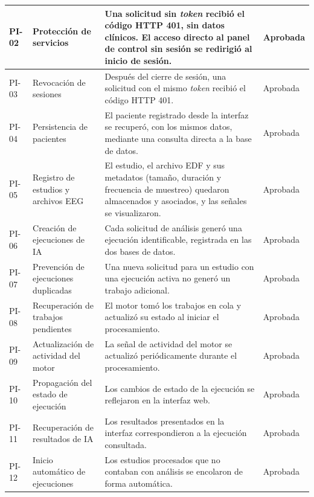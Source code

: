 \begin{nuevotexto}
\begin{longtable}{|p{1.25cm}|p{3.4cm}|p{7.6cm}|p{1.75cm}|}
PI-02 &
Protección de servicios &
Una solicitud sin \textit{token} recibió el código HTTP 401, sin datos clínicos. El acceso directo al panel de control sin sesión se redirigió al inicio de sesión. &
Aprobada \\
\hline

PI-03 &
Revocación de sesiones &
Después del cierre de sesión, una solicitud con el mismo \textit{token} recibió el código HTTP 401. &
Aprobada \\
\hline

PI-04 &
Persistencia de pacientes &
El paciente registrado desde la interfaz se recuperó, con los mismos datos, mediante una consulta directa a la base de datos. &
Aprobada \\
\hline

PI-05 &
Registro de estudios y archivos EEG &
El estudio, el archivo EDF y sus metadatos (tamaño, duración y frecuencia de muestreo) quedaron almacenados y asociados, y las señales se visualizaron. &
Aprobada \\
\hline

PI-06 &
Creación de ejecuciones de IA &
Cada solicitud de análisis generó una ejecución identificable, registrada en las dos bases de datos. &
Aprobada \\
\hline

PI-07 &
Prevención de ejecuciones duplicadas &
Una nueva solicitud para un estudio con una ejecución activa no generó un trabajo adicional. &
Aprobada \\
\hline

PI-08 &
Recuperación de trabajos pendientes &
El motor tomó los trabajos en cola y actualizó su estado al iniciar el procesamiento. &
Aprobada \\
\hline

PI-09 &
Actualización de actividad del motor &
La señal de actividad del motor se actualizó periódicamente durante el procesamiento. &
Aprobada \\
\hline

PI-10 &
Propagación del estado de ejecución &
Los cambios de estado de la ejecución se reflejaron en la interfaz web. &
Aprobada \\
\hline

PI-11 &
Recuperación de resultados de IA &
Los resultados presentados en la interfaz correspondieron a la ejecución consultada. &
Aprobada \\
\hline

PI-12 &
Inicio automático de ejecuciones &
Los estudios procesados que no contaban con análisis se encolaron de forma automática. &
Aprobada \\
\hline


\end{longtable}
\end{nuevotexto}
